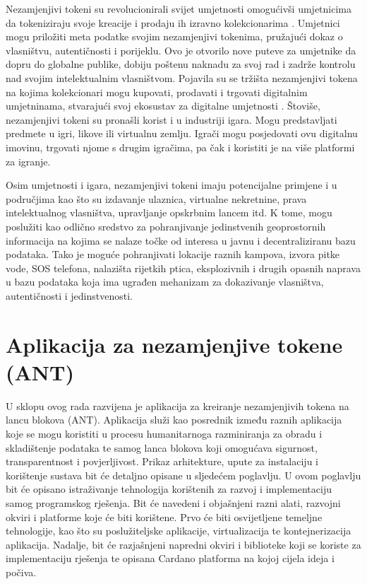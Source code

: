 \documentclass[times, utf8, diplomski]{fer}
\begin{document}
Nezamjenjivi tokeni su revolucionirali svijet umjetnosti omogućivši umjetnicima da tokeniziraju svoje kreacije i prodaju ih izravno kolekcionarima \cite{ante2022non}. Umjetnici mogu priložiti meta podatke svojim nezamjenjivi tokenima, pružajući dokaz o vlasništvu, autentičnosti i porijeklu. Ovo je otvorilo nove puteve za umjetnike da dopru do globalne publike, dobiju poštenu naknadu za svoj rad i zadrže kontrolu nad svojim intelektualnim vlasništvom. Pojavila su se tržišta nezamjenjivi tokena na kojima kolekcionari mogu kupovati, prodavati i trgovati digitalnim umjetninama, stvarajući svoj ekosustav za digitalne umjetnosti \cite{ante2022nona}. Štoviše, nezamjenjivi tokeni su pronašli korist i u industriji igara. Mogu predstavljati predmete u igri, likove ili virtualnu zemlju. Igrači mogu posjedovati ovu digitalnu imovinu, trgovati njome s drugim igračima, pa čak i koristiti je na više platformi za igranje.

Osim umjetnosti i igara, nezamjenjivi tokeni imaju potencijalne primjene i u područjima kao što su izdavanje ulaznica, virtualne nekretnine, prava intelektualnog vlasništva, upravljanje opskrbnim lancem itd. K tome, mogu poslužiti kao odlično sredstvo za pohranjivanje jedinstvenih geoprostornih informacija na kojima se nalaze točke od interesa u javnu i decentraliziranu bazu podataka. Tako je moguće pohranjivati lokacije raznih kampova, izvora pitke vode, SOS telefona, nalazišta rijetkih ptica, eksplozivnih i drugih opasnih naprava u bazu podataka koja ima ugrađen mehanizam za dokazivanje vlasništva, autentičnosti i jedinstvenosti.

\chapter{Aplikacija za nezamjenjive tokene (ANT)}

U sklopu ovog rada razvijena je aplikacija za kreiranje nezamjenjivih tokena na lancu blokova (ANT). Aplikacija služi kao posrednik između raznih aplikacija koje se mogu koristiti u procesu humanitarnoga razminiranja za obradu i skladištenje podataka te samog lanca blokova koji omogućava sigurnost, transparentnost i povjerljivost. Prikaz arhitekture, upute za instalaciju i korištenje sustava bit će detaljno opisane u sljedećem poglavlju. U ovom poglavlju bit će opisano istraživanje tehnologija korištenih za razvoj i implementaciju samog programskog rješenja. Bit će navedeni i objašnjeni razni alati, razvojni okviri i platforme koje će biti korištene. Prvo će biti osvijetljene temeljne tehnologije, kao što su poslužiteljske aplikacije, virtualizacija te kontejnerizacija aplikacija. Nadalje, bit će razjašnjeni napredni okviri i biblioteke koji se koriste za implementaciju rješenja te opisana Cardano platforma na kojoj cijela ideja i počiva.
\end{document}
